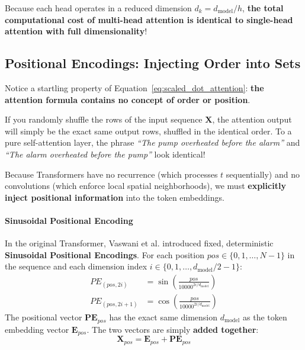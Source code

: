 Because each head operates in a reduced dimension $d_k = d_{\text{model}} / h$, \textbf{the total computational cost of multi-head attention is identical to single-head attention with full dimensionality}!

\subsection{Positional Encodings: Injecting Order into Sets}\label{subsec:positional_encoding}

\begin{keyidea}
Notice a startling property of Equation~\eqref{eq:scaled_dot_attention}: \textbf{the attention formula contains no concept of order or position}. 

If you randomly shuffle the rows of the input sequence $\mathbf{X}$, the attention output will simply be the exact same output rows, shuffled in the identical order. To a pure self-attention layer, the phrase \emph{``The pump overheated before the alarm''} and \emph{``The alarm overheated before the pump''} look identical!
\end{keyidea}

Because Transformers have no recurrence (which processes $t$ sequentially) and no convolutions (which enforce local spatial neighborhoods), we must \textbf{explicitly inject positional information} into the token embeddings.

\paragraph{Sinusoidal Positional Encoding}
In the original Transformer, Vaswani et al. introduced fixed, deterministic \textbf{Sinusoidal Positional Encodings}. For each position $pos \in \{0, 1, \dots, N-1\}$ in the sequence and each dimension index $i \in \{0, 1, \dots, d_{\text{model}}/2 - 1\}$:
\begin{align}
PE_{(pos, 2i)} &= \sin\left(\frac{pos}{10000^{2i/d_{\text{model}}}}\right)\label{eq:pe_sin} \\
PE_{(pos, 2i+1)} &= \cos\left(\frac{pos}{10000^{2i/d_{\text{model}}}}\right)\label{eq:pe_cos}
\end{align}
The positional vector $\mathbf{PE}_{pos}$ has the exact same dimension $d_{\text{model}}$ as the token embedding vector $\mathbf{E}_{pos}$. The two vectors are simply \textbf{added together}:
\begin{equation}
\mathbf{X}_{pos} = \mathbf{E}_{pos} + \mathbf{PE}_{pos}\label{eq:pe_addition}
\end{equation}

